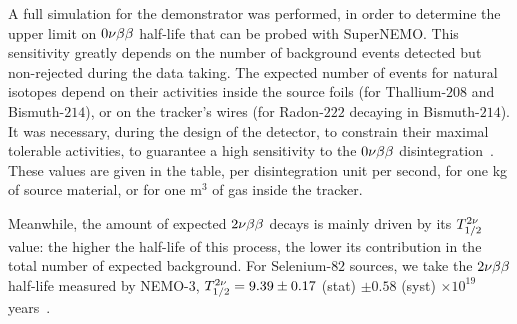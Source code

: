 A full simulation for the demonstrator was performed, in order to determine the upper limit on $0\nu\beta\beta$ half-life that can be probed with SuperNEMO.
This sensitivity greatly depends on the number of background events detected but non-rejected during the data taking.
The expected number of events for natural isotopes depend on their activities inside the source foils (for Thallium-$208$ and Bismuth-$214$), or on the tracker's wires (for Radon-$222$ decaying in Bismuth-$214$).
It was necessary, during the design of the detector, to constrain their maximal tolerable activities, to guarantee a high sensitivity to the $0\nu\beta\beta$ disintegration~\cite{internal:SNphysicsCase}.
These values are given in the table, per disintegration unit per second, for one kg of source material, or for one m$^{3}$ of gas inside the tracker.

Meanwhile, the amount of expected $2\nu\beta\beta$ decays is mainly driven by its $T_{1/2}^{2\nu}$ value: the higher the half-life of this process, the lower its contribution in the total number of expected background.
For Selenium-$82$ sources, we take the $2\nu\beta\beta$ half-life measured by NEMO-$3$, $T_{1/2}^{2\nu} = 9.39 \pm 0.17$ (stat) $\pm 0.58$ (syst) $\times 10^{19}$ years~\cite{art:NEMO2018}.

